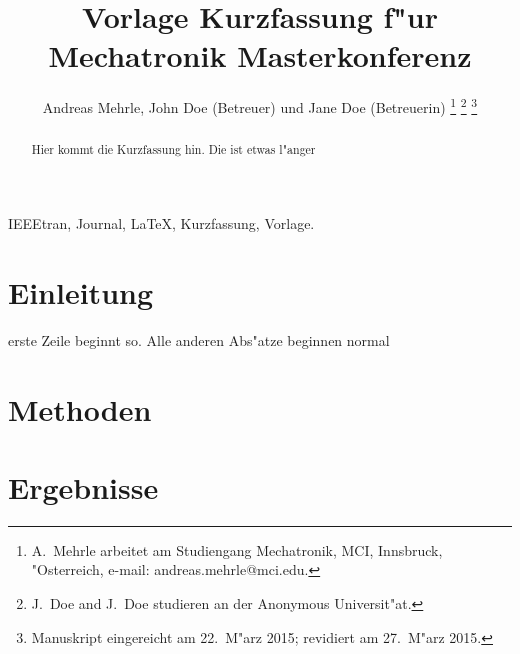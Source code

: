 \documentclass[journal,9pt]{IEEEtran}
\begin{document}
%
\title{Vorlage Kurzfassung f"ur Mechatronik Masterkonferenz}
%
%
%

\author{Andreas Mehrle, John Doe (Betreuer) und Jane Doe (Betreuerin)
\thanks{A.~Mehrle arbeitet am Studiengang Mechatronik, MCI, Innsbruck, "Osterreich, e-mail: andreas.mehrle@mci.edu.}
\thanks{J.~Doe and J.~Doe studieren an der Anonymous Universit"at.}
\thanks{Manuskript eingereicht am 22.~M"arz 2015; revidiert am 27.~M"arz 2015.}}



\maketitle

\begin{abstract}
Hier kommt die Kurzfassung hin. Die ist etwas l"anger
\end{abstract}

\begin{IEEEkeywords}
IEEEtran, Journal, \LaTeX, Kurzfassung, Vorlage.
\end{IEEEkeywords}

\section{Einleitung}

 erste Zeile beginnt so. Alle anderen Abs"atze beginnen normal \cite{kat06}

\section{Methoden}

\section{Ergebnisse}
\end{document}

